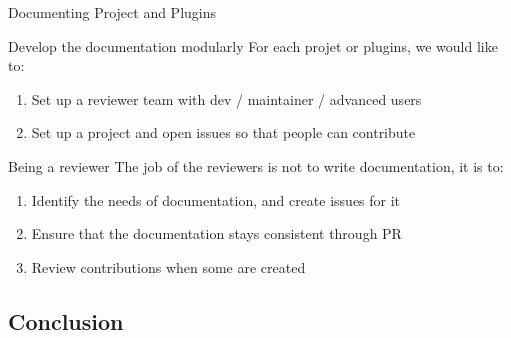 \documentclass[10pt]{beamer}
\begin{document}
\begin{frame}{Documenting Project and Plugins}
  \begin{tcbProp}{Develop the documentation modularly}
    For each projet or plugins, we would like to:
    \begin{enumerate}
      \item<2-> Set up a reviewer team with dev / maintainer / advanced users
      \item<2-> Set up a project and open issues so that people can contribute
    \end{enumerate}
  \end{tcbProp}
  \begin{tcbProp}{Being a reviewer}
    The job of the reviewers is not to write documentation, it is to:
    \begin{enumerate}
      \item<4-> Identify the needs of documentation, and create issues for it
      \item<5-> Ensure that the documentation stays consistent through PR
      \item<6-> Review contributions when some are created
    \end{enumerate}
  \end{tcbProp}
\end{frame}

\subsection{Conclusion}
\end{document}
